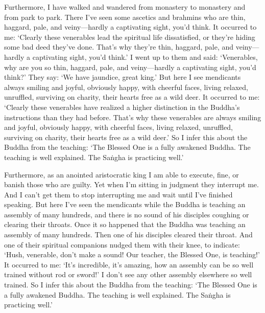 \documentclass[12pt,openany]{book}%
\begin{document}
Furthermore, I have walked and wandered from monastery to monastery and from park to park. There I’ve seen some ascetics and brahmins who are thin, haggard, pale, and veiny—hardly a captivating sight, you’d think. It occurred to me: ‘Clearly these venerables lead the spiritual life dissatisfied, or they’re hiding some bad deed they’ve done. That’s why they’re thin, haggard, pale, and veiny—hardly a captivating sight, you’d think.’ I went up to them and said: ‘Venerables, why are you so thin, haggard, pale, and veiny—hardly a captivating sight, you’d think?’ They say: ‘We have jaundice, great king.’ But here I see mendicants always smiling and joyful, obviously happy, with cheerful faces, living relaxed, unruffled, surviving on charity, their hearts free as a wild deer. It occurred to me: ‘Clearly these venerables have realized a higher distinction in the Buddha’s instructions than they had before. That’s why these venerables are always smiling and joyful, obviously happy, with cheerful faces, living relaxed, unruffled, surviving on charity, their hearts free as a wild deer.’ So I infer this about the Buddha from the teaching: ‘The Blessed One is a fully awakened Buddha. The teaching is well explained. The \textsanskrit{Saṅgha} is practicing well.’ 

Furthermore, as an anointed aristocratic king I am able to execute, fine, or banish those who are guilty. Yet when I’m sitting in judgment they interrupt me. And I can’t get them to stop interrupting me and wait until I’ve finished speaking. But here I’ve seen the mendicants while the Buddha is teaching an assembly of many hundreds, and there is no sound of his disciples coughing or clearing their throats. Once it so happened that the Buddha was teaching an assembly of many hundreds. Then one of his disciples cleared their throat. And one of their spiritual companions nudged them with their knee, to indicate: ‘Hush, venerable, don’t make a sound! Our teacher, the Blessed One, is teaching!’ It occurred to me: ‘It’s incredible, it’s amazing, how an assembly can be so well trained without rod or sword!’ I don’t see any other assembly elsewhere so well trained. So I infer this about the Buddha from the teaching: ‘The Blessed One is a fully awakened Buddha. The teaching is well explained. The \textsanskrit{Saṅgha} is practicing well.’ 
\end{document}
